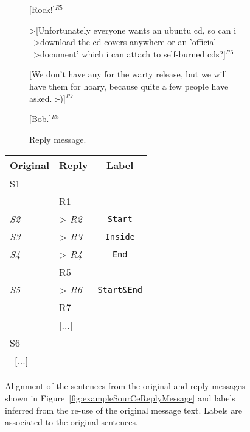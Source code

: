 \begin{figure}[h]
\begin{minipage}{.57\textwidth}
{{\begin{subfigure}[b]{0.9\textwidth}
                    [Rock!]$^{R5}$\vspace{0.1cm}

                    \textgreater [Unfortunately everyone wants an ubuntu cd, so can i \\ \ 
                    \textgreater download the cd covers anywhere or an 'official \\ \ 
                    \textgreater document' which i can attach to self-burned cds?]$^{R6}$\vspace{0.1cm}

                    [We don't have any for the warty release, but we will have them for hoary, %
                    because quite a few people have asked. :-)]$^{R7}$\vspace{0.1cm}

                    [Bob.]$^{R8}$ %

                    \caption{Reply message.}
                    \label{fig:exampleReply}
                \end{subfigure}
            }
        }

        \caption{An original message and its reply (\textit{ubuntu-users} email archive). Sentences have been tagged to facilitate the discussion.}
        \label{fig:exampleSourCeReplyMessage}
    \end{minipage}
    \hfill
    \begin{minipage}{.57\textwidth}
        \small\centering
        \begin{tabular}{*{2}{|l}|c|}
        \toprule
        \textbf{Original} & \textbf{Reply} & \textbf{Label}\\
        	\midrule
            S1  & & \\
            & R1 & \\
            \textit{S2}  & > \textit{R2}& \texttt{Start}\\
            \textit{S3}  & > \textit{R3}& \texttt{Inside}\\
            \textit{S4}  & > \textit{R4}& \texttt{End}\\
            & R5 & \\
            \textit{S5}  & > \textit{R6} & \texttt{Start\&End}\\
            & R7 & \\
            & [...] & \\
            S6    &  & \\ \ 
            [...] \    &  & \\
        	\bottomrule
        \end{tabular}
        \caption{Alignment of the sentences from the original and reply messages shown in Figure~\ref{fig:exampleSourCeReplyMessage} and labels inferred from the re-use of the original message text. Labels are associated to the original sentences.}
        \label{fig:exampleSegmentationLabels}
    \end{minipage}
\end{figure}

